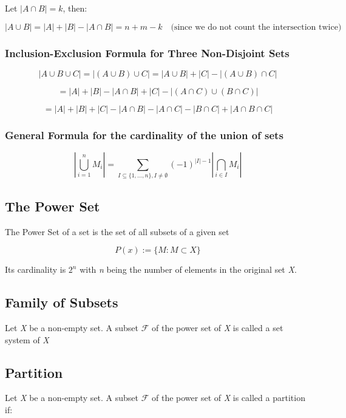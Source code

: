 Let \( |A \cap B| = k \), then:

\[
	|A \cup B| = |A| + |B| - |A \cap B| = n + m - k \quad \text{(since we do not count the intersection 
	twice)}
\]

\subsubsection{Inclusion-Exclusion Formula for Three Non-Disjoint Sets}

\[
	|A \cup B \cup C| = |(A \cup B) \cup C| = |A \cup B| + |C| - |(A \cup B) \cap C|
\]

\[
	= |A| + |B| - |A \cap B| + |C| - |(A \cap C) \cup (B \cap C)|
\]

\[
	= |A| + |B| + |C| - |A \cap B| - |A \cap C| - |B \cap C| + |A \cap B \cap C|
\]

\subsubsection{General Formula for the cardinality of the union of sets}

\[
	\left\vert \bigcup_{i = 1}^n M_i \right\vert  = \sum_{I \subseteq \{1, \dots, n\}, I \neq \emptyset}
	{(-1)}^{|I| - 1} \left\vert \bigcap_{i \in I} M_i \right\vert
\]

\subsection{The Power Set}

The Power Set of a set is the set of all subsets of a given set 

\[
	P(x):= \{ M: M \subset X\}
\]

Its cardinality is \(2^n\) with \emph{n} being the number of elements in the original set \emph{X}.

\subsection{Family of Subsets}

Let \emph{X} be a non-empty set. A subset \(\mathscr{F}\) of the power set of \emph{X} is called a set system of \emph{X}

\subsection{Partition}

Let \emph{X} be a non-empty set. A subset \(\mathscr{F}\) of the power set of \emph{X} is called a partition if:

